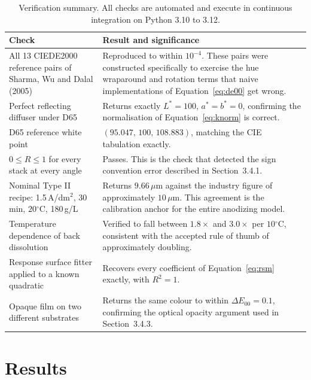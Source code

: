 \documentclass[11pt,a4paper]{article}
\newcommand{\dE}{\ensuremath{\Delta E_{00}}}
\newcommand{\um}{\ensuremath{\,\mu\mathrm{m}}}
\newcommand{\degC}{\ensuremath{^\circ\mathrm{C}}}
\begin{document}
\begin{table}[htbp]
\centering
\small
\begin{tabular}{@{}p{}p{}@{}}
\toprule
\textbf{Check} & \textbf{Result and significance} \\
\midrule
All 13 CIEDE2000 reference pairs of Sharma, Wu and Dalal (2005) &
Reproduced to within $10^{-4}$. These pairs were constructed specifically to
exercise the hue wraparound and rotation terms that naive implementations of
Equation~\eqref{eq:de00} get wrong. \\
\addlinespace
Perfect reflecting diffuser under D65 &
Returns exactly $L^* = 100$, $a^* = b^* = 0$, confirming the normalisation of
Equation~\eqref{eq:knorm} is correct. \\
\addlinespace
D65 reference white point &
$(95.047,\,100,\,108.883)$, matching the CIE tabulation exactly. \\
\addlinespace
$0 \le R \le 1$ for every stack at every angle &
Passes. This is the check that detected the sign convention error described in
Section~3.4.1. \\
\addlinespace
Nominal Type II recipe: 1.5\,A/dm$^2$, 30 min, $20\degC$, 180\,g/L &
Returns $9.66\um$ against the industry figure of approximately $10\um$. This
agreement is the calibration anchor for the entire anodizing model. \\
\addlinespace
Temperature dependence of back dissolution &
Verified to fall between $1.8\times$ and $3.0\times$ per $10\degC$, consistent
with the accepted rule of thumb of approximately doubling. \\
\addlinespace
Response surface fitter applied to a known quadratic &
Recovers every coefficient of Equation~\eqref{eq:rsm} exactly, with
$R^2 = 1$. \\
\addlinespace
Opaque film on two different substrates &
Returns the same colour to within $\dE = 0.1$, confirming the optical opacity
argument used in Section~3.4.3. \\
\bottomrule
\end{tabular}
\caption{Verification summary. All checks are automated and execute in
continuous integration on Python 3.10 to 3.12.}
\end{table}

\section{Results}
\end{document}
